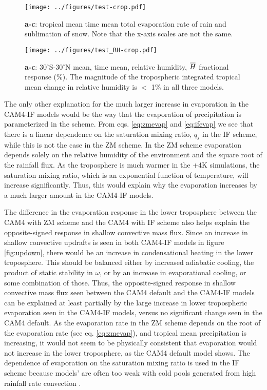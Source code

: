 \documentclass[letterpaper,12pt,titlepage,oneside,final]{book}
\newcommand{\overbar}[1]{\mkern 1.5mu\overline{\mkern-1.5mu#1\mkern-1.5mu}\mkern 1.5mu}
\begin{document}
\begin{figure}[H]
\centering
\noindent\texttt{[image: ../figures/test-crop.pdf]}\hfill
\caption{\textbf{a-c}: tropical mean time mean total evaporation rate of rain and sublimation of snow. Note that the x-axis scales are not the same.}
\label{fig:evap}
\end{figure}
\begin{figure}[H]
\centering
\noindent\texttt{[image: ../figures/test\_RH-crop.pdf]}\hfill
\caption{\textbf{a-c}: 30$^{\circ}$S-30$^{\circ}$N mean, time mean, relative humidity, $\overbar{H}$ fractional response (\%). The magnitude of the tropospheric integrated tropical mean change in relative humidity is $<$ 1\% in all three models. }
\label{fig:RH}
\end{figure}
\newpage
The only other explanation for the much larger increase in evaporation in the CAM4-IF models would be the way that the evaporation of precipitation is parameterized in the scheme. From eqs. \ref{eq:zmevap} and \ref{eq:ifevap} we see that there is a linear dependence on the saturation mixing ratio, $q_{s}$ in the IF scheme, while this is not the case in the ZM scheme. In the ZM scheme evaporation depends solely on the relative humidity of the environment and the square root of the rainfall flux. As the troposphere is much warmer in the +4K simulations, the saturation mixing ratio, which is an exponential function of temperature, will increase significantly. Thus, this would explain why the evaporation increases by a much larger amount in the CAM4-IF models.

The difference in the evaporation response in the lower troposphere between the CAM4 with ZM scheme and the CAM4 with IF scheme also helps explain the opposite-signed response in shallow convective mass flux. Since an increase in shallow convective updrafts is seen in both CAM4-IF models in figure \ref{fig:updown}, there would be an increase in condensational heating in the lower troposphere. This should be balanced either by increased adiabatic cooling, the product of static stability in $\omega$, or by an increase in evaporational cooling, or some combination of those. Thus, the opposite-signed response in shallow convective mass flux seen between the CAM4 default and the CAM4-IF models can be explained at least partially by the large increase in lower tropospheric evaporation seen in the CAM4-IF models, versus no significant change seen in the CAM4 default. As the evaporation rate in the ZM scheme depends on the root of the evaporation rate (see eq. \ref{eq:zmevap}), and tropical mean precipitation is increasing, it would not seem to be physically consistent that evaporation would not increase in the lower troposphere, as the CAM4 default model shows. The dependence of evaporation on the saturation mixing ratio is used in the IF scheme because models' are often too weak with cold pools generated from high rainfall rate convection \citep{mitovski_temperature_2010}.
\end{document}
